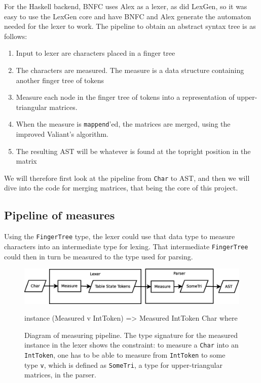 \documentclass[a4paper,12pt,twosided]{report}
\begin{document}
For the Haskell backend, BNFC uses Alex as a lexer, as did LexGen, so it was
easy to use the LexGen core and have BNFC and Alex generate the automaton needed
for the lexer to work. The pipeline to obtain an abstract syntax tree is as
follows:

\begin{enumerate}
    \item Input to lexer are characters placed in a finger tree
    \item The characters are measured. The measure is a data structure containing
          another finger tree of tokens
    \item Measure each node in the finger tree of tokens into a representation
          of upper-triangular matrices.
    \item When the measure is \texttt{mappend}'ed, the matrices are merged,
          using the improved Valiant's algorithm.
    \item The resulting AST will be whatever is found at the topright position
          in the matrix
\end{enumerate}
We will therefore first look at the pipeline from \texttt{Char} to AST, and then
we will dive into the code for merging matrices, that being the core of this
project. 

\subsection{Pipeline of measures}
\label{pipeline}
Using the \texttt{FingerTree} type, the lexer could use that data type to
measure characters into an intermediate type for lexing. That intermediate
\texttt{FingerTree} could then in turn be measured to the type used for parsing.

\begin{figure}[H]
\includegraphics[width=\textwidth]{pipeline.eps}
\begin{code}
instance (Measured v IntToken) => Measured IntToken Char where
\end{code}
\caption{\label{pipelinedia}Diagram of measuring pipeline. The type signature
for the measured instance in the lexer shows the constraint: to measure a
\texttt{Char} into an \texttt{IntToken}, one has to be able to measure from
\texttt{IntToken} to some type \texttt{v}, which is defined as \texttt{SomeTri},
a type for upper-triangular matrices, in the parser.}
\end{figure}
\end{document}
